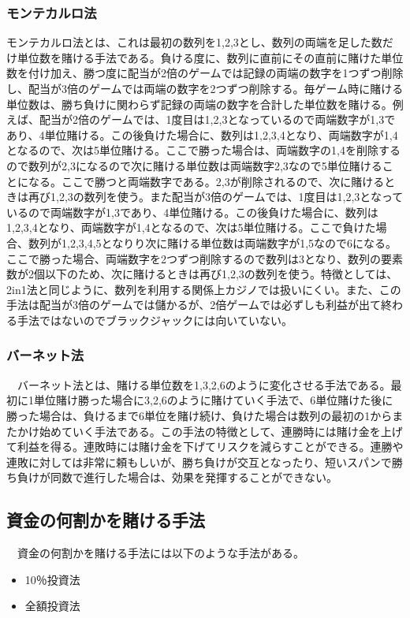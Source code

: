 \subsubsection{モンテカルロ法}
 モンテカルロ法とは、これは最初の数列を{1,2,3}とし、数列の両端を足した数だけ単位数を賭ける手法である。負ける度に、数列に直前にその直前に賭けた単位数を付け加え、勝つ度に配当が2倍のゲームでは記録の両端の数字を1つずつ削除し、配当が3倍のゲームでは両端の数字を2つずつ削除する。毎ゲーム時に賭ける単位数は、勝ち負けに関わらず記録の両端の数字を合計した単位数を賭ける。例えば、配当が2倍のゲームでは、1度目は{1,2,3}となっているので両端数字が1,3であり、4単位賭ける。この後負けた場合に、数列は{1,2,3,4}となり、両端数字が1,4となるので、次は5単位賭ける。ここで勝った場合は、両端数字の1,4を削除するので数列が{2,3}になるので次に賭ける単位数は両端数字2,3なので5単位賭けることになる。ここで勝つと両端数字である。2,3が削除されるので、次に賭けるときは再び{1,2,3}の数列を使う。また配当が3倍のゲームでは、1度目は{1,2,3}となっているので両端数字が1,3であり、4単位賭ける。この後負けた場合に、数列は{1,2,3,4}となり、両端数字が1,4となるので、次は5単位賭ける。ここで負けた場合、数列が{1,2,3,4,5}となりり次に賭ける単位数は両端数字が{1,5}なので6になる。ここで勝った場合、両端数字を2つずつ削除するので数列は{3}となり、数列の要素数が2個以下のため、次に賭けるときは再び{1,2,3}の数列を使う。特徴としては、2in1法と同じように、数列を利用する関係上カジノでは扱いにくい。また、この手法は配当が3倍のゲームでは儲かるが、2倍ゲームでは必ずしも利益が出て終わる手法ではないのでブラックジャックには向いていない。\\
\subsubsection{バーネット法}
　バーネット法とは、賭ける単位数を1,3,2,6のように変化させる手法である。最初に1単位賭け勝った場合に3,2,6のように賭けていく手法で、6単位賭けた後に勝った場合は、負けるまで6単位を賭け続け、負けた場合は数列の最初の1からまたかけ始めていく手法である。この手法の特徴として、連勝時には賭け金を上げて利益を得る。連敗時には賭け金を下げてリスクを減らすことができる。連勝や連敗に対しては非常に頼もしいが、勝ち負けが交互となったり、短いスパンで勝ち負けが同数で進行した場合は、効果を発揮することができない。

\subsection{資金の何割かを賭ける手法}
　資金の何割かを賭ける手法には以下のような手法がある。
  \begin{itemize}
 \item 10％投資法
 \item 全額投資法
 \end{itemize}
